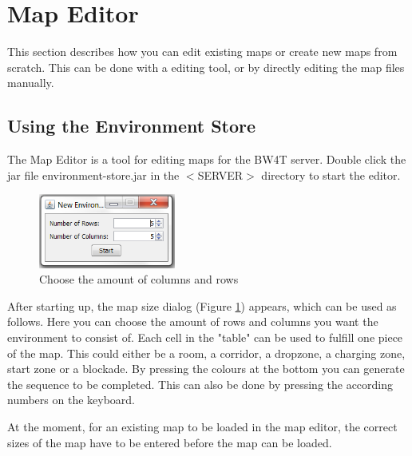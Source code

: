\newpage

\section{Map Editor}
This section describes how you can edit existing maps or create new maps from scratch. This can be done with a editing tool, or by directly editing the map files manually.




\subsection{Using the Environment Store}
The Map Editor is a tool for editing maps for the BW4T server. Double click the jar file environment-store.jar  in the $<$SERVER$>$ directory to start the  editor.

\begin{figure}
  \begin{center}
    \includegraphics[width=0.4\textwidth]{EnvironmentStore/SizeDialog.png}
  \end{center}
  \caption{Choose the amount of columns and rows}\label{fig:MapSize}
\end{figure}


After starting up, the map size dialog (Figure \ref{fig:MapSize}) appears, which can be used as follows.
Here you can choose the amount of rows and columns you want the environment to consist of. Each cell in the "table" can be used to fulfill one piece of the map. This could either be a room, a corridor, a dropzone, a charging zone, start zone or a blockade. By pressing the colours at the bottom you can generate the sequence to be completed. This can also be done by pressing the according numbers on the keyboard. 



At the moment, for an existing map to be loaded in the map editor, the correct sizes of the map have to be entered before the map can be loaded.

